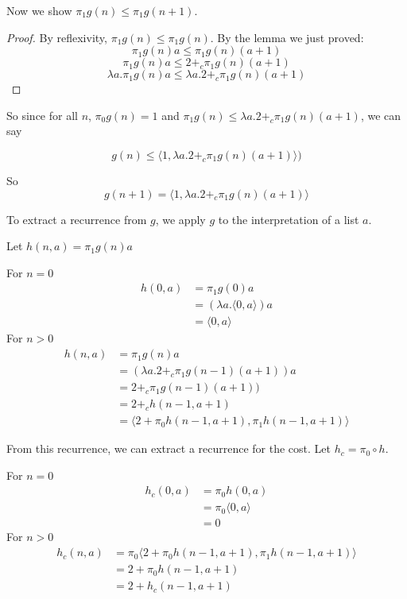 Now we show $\pi_1 g(n) \leq \pi_1 g(n+1)$.
\begin{proof}
  By reflexivity, $\pi_1 g(n) \leq \pi_1 g(n)$.
  By the lemma we just proved:
  \[ \pi_1 g(n) a \leq \pi_1 g(n) (a+1) \]
  \[ \pi_1 g(n) a \leq 2 +_c \pi_1 g(n) (a+1) \]
  \[ \lambda a.\pi_1 g(n) a \leq \lambda a. 2 +_c \pi_1 g(n) (a+1) \]
\end{proof}

So since for all $n$, $\pi_0 g(n) = 1$ and $\pi_1 g(n) \leq \lambda a. 2 +_c \pi_1 g(n) (a+1)$, we can say

\[ g(n) \leq \langle 1, \lambda a. 2 +_c \pi_1g(n) (a+1)\rangle) \]

So 
\[ g(n+1) = \langle 1, \lambda a. 2 +_c \pi_1g(n) (a+1)\rangle\]


To extract a recurrence from $g$, we apply $g$ to the interpretation of a list $a$.

Let $h(n,a) = \pi_1 g(n) a$

For $n=0$
\begin{align*}
h(0,a) &= \pi_1 g(0) a \\
&= (\lambda a.\langle 0,a\rangle) a \\
&= \langle 0, a\rangle
\end{align*}
For $n>0$
\begin{align*}
h(n,a) &= \pi_1 g(n) a \\ 
&= (\lambda a. 2 +_c \pi_1g(n-1) (a+1)) a \\
&= 2 +_c \pi_1 g(n-1) (a+1)) \\
&= 2 +_c h(n-1,a+1) \\
&= \langle 2 + \pi_0 h(n-1,a+1), \pi_1 h(n-1,a+1)\rangle
\end{align*}

From this recurrence, we can extract a recurrence for the cost. Let $h_c = \pi_0 \circ h$.

For $n=0$
\begin{align*}
h_c(0,a) &= \pi_0 h(0,a)\\
&= \pi_0 \langle 0, a\rangle\\
&= 0
\end{align*}
For $n>0$
\begin{align*}
h_c(n,a) &= \pi_0 \langle 2 + \pi_0 h(n-1,a+1), \pi_1 h(n-1,a+1)\rangle\\
&= 2 + \pi_0 h(n-1,a+1)\\
&= 2 + h_c(n-1,a+1)
\end{align*}

